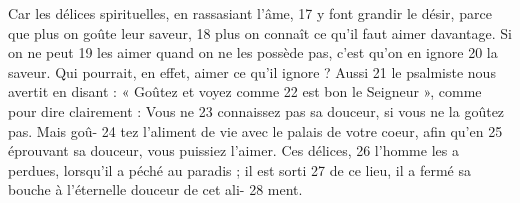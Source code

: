 Car les délices spirituelles, en rassasiant l'âme,	 
17	 	y font grandir le désir, parce que plus on goûte leur saveur,	 
18	 	plus on connaît ce qu'il faut aimer davantage. Si on ne peut	 
19	 	les aimer quand on ne les possède pas, c'est qu'on en ignore	 
20	 	la saveur. Qui pourrait, en effet, aimer ce qu'il ignore ? Aussi	 
21	 	le psalmiste nous avertit en disant : « Goûtez et voyez comme	 
22	 	est bon le Seigneur », comme pour dire clairement : Vous ne	 
23	 	connaissez pas sa douceur, si vous ne la goûtez pas. Mais goû-	 
24	 	tez l'aliment de vie avec le palais de votre coeur, afin qu'en	 
25	 	éprouvant sa douceur, vous puissiez l'aimer. Ces délices,	 
26	 	l'homme les a perdues, lorsqu'il a péché au paradis ; il est sorti	 
27	 	de ce lieu, il a fermé sa bouche à l'éternelle douceur de cet ali-	 
28	 	ment.